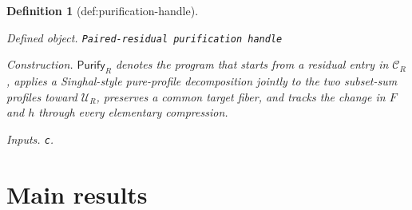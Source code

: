 \documentclass{article}
\newtheorem{definition}{Definition}
\begin{document}
\begin{definition}[def:purification-handle]\label{def:purification-handle}
\par\smallskip\noindent\emph{Defined object.} \texttt{Paired-\allowbreak{}residual purification handle}
\par\smallskip\noindent\emph{Construction.} \(\mathsf{Purify}_R\) denotes the program that starts from a residual entry in \(\mathcal C_R\), applies a Singhal-style pure-profile decomposition jointly to the two subset-sum profiles toward \(\mathcal U_R\), preserves a common target fiber, and tracks the change in \(F\) and \(h\) through every elementary compression.
\par\smallskip\noindent\emph{Inputs.} \texttt{c}.
\end{definition}

\section{Main results}
\end{document}
